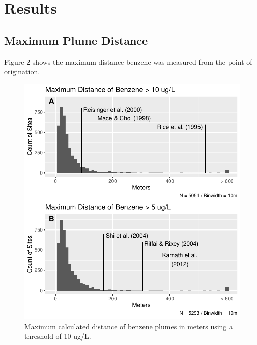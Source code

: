 \documentclass[draft,linenumbers]{agujournal2018}
\begin{document}
\section{Results}

\subsection{Maximum Plume Distance}

Figure 2 shows the maximum distance benzene was measured from the point
of origination.

\begin{figure}[h]
\includegraphics{CA_Benzene_Plumes_files/figure-latex/maxDist-1} \caption{Maximum calculated distance of benzene plumes in meters using a threshold of 10 ug/L.}\label{fig:maxDist}
\end{figure}
\end{document}
